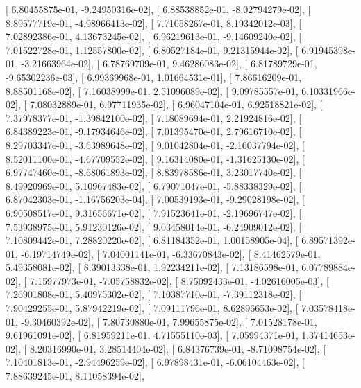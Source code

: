\documentclass{article}
\begin{document}
       [  6.80455875e-01,  -9.24950316e-02],
       [  6.88538852e-01,  -8.02794279e-02],
       [  8.89577719e-01,  -4.98966413e-02],
       [  7.71058267e-01,   8.19342012e-03],
       [  7.02892386e-01,   4.13673245e-02],
       [  6.96219613e-01,  -9.14609240e-02],
       [  7.01522728e-01,   1.12557800e-02],
       [  6.80527184e-01,   9.21315944e-02],
       [  6.91945398e-01,  -3.21663964e-02],
       [  6.78769709e-01,   9.46286083e-02],
       [  6.81789729e-01,  -9.65302236e-03],
       [  6.99369968e-01,   1.01664531e-01],
       [  7.86616209e-01,   8.88501168e-02],
       [  7.16038999e-01,   2.51096089e-02],
       [  9.09785557e-01,   6.10331966e-02],
       [  7.08032889e-01,   6.97711935e-02],
       [  6.96047104e-01,   6.92518821e-02],
       [  7.37978377e-01,  -1.39842100e-02],
       [  7.18089694e-01,   2.21924816e-02],
       [  6.84389223e-01,  -9.17934646e-02],
       [  7.01395470e-01,   2.79616710e-02],
       [  8.29703347e-01,  -3.63989648e-02],
       [  9.01042804e-01,  -2.16037794e-02],
       [  8.52011100e-01,  -4.67709552e-02],
       [  9.16314080e-01,  -1.31625130e-02],
       [  6.97747460e-01,  -8.68061893e-02],
       [  8.83978586e-01,   3.23017740e-02],
       [  8.49920969e-01,   5.10967483e-02],
       [  6.79071047e-01,  -5.88338329e-02],
       [  6.87042303e-01,  -1.16756203e-04],
       [  7.00539193e-01,  -9.29028198e-02],
       [  6.90508517e-01,   9.31656671e-02],
       [  7.91523641e-01,  -2.19696747e-02],
       [  7.53938975e-01,   5.91230126e-02],
       [  9.03458014e-01,  -6.24909012e-02],
       [  7.10809442e-01,   7.28820220e-02],
       [  6.81184352e-01,   1.00158905e-04],
       [  6.89571392e-01,  -6.19714749e-02],
       [  7.04001141e-01,  -6.33670843e-02],
       [  8.41462579e-01,   5.49358081e-02],
       [  8.39013338e-01,   1.92234211e-02],
       [  7.13186598e-01,   6.07789884e-02],
       [  7.15977973e-01,  -7.05758832e-02],
       [  8.75092433e-01,  -4.02616005e-03],
       [  7.26901808e-01,   5.40975302e-02],
       [  7.10387710e-01,  -7.39112318e-02],
       [  7.90429255e-01,   5.87942219e-02],
       [  7.09111796e-01,   8.62896653e-02],
       [  7.03578418e-01,  -9.30460392e-02],
       [  7.80730880e-01,   7.99655875e-02],
       [  7.01528178e-01,   9.61961091e-02],
       [  6.81959211e-01,   4.71555110e-03],
       [  7.05994371e-01,   1.37414653e-02],
       [  8.20316990e-01,   3.28514404e-02],
       [  6.84376739e-01,  -8.71098754e-02],
       [  7.10401813e-01,  -2.94496259e-02],
       [  6.97898431e-01,  -6.06104463e-02],
       [  7.88639245e-01,   8.11058394e-02],
\end{document}

